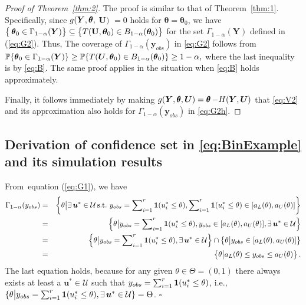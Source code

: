 \documentclass[12pt]{article}
\theoremstyle{shortspace}
\def\*#1{\bm{#1}}
\def\btheta{\mathop{\theta\kern-.45em\hbox{$\theta$}}\nolimits}
\def\P{\mathbb P}
\begin{document}
\begin{proof}[Proof of Theorem~\ref{thm:2}] The proof is similar to that of Theorem~\ref{thm:1}. Specifically, since $g(\*Y, \btheta, $ $ \*U)$ $ =0$ holds for $\*\theta = \*\theta_0$, 
we have 
$\big\{\btheta_0 \in \Gamma_{1-\alpha}({\*Y})\big\} \subseteq \big\{T({\bf U}, \*\theta_0) \in B_{1 -\alpha}(\*\theta_0)\big\}$ for the set $\Gamma_{1-\alpha}({\*Y})$ defined in (\ref{eq:G2}). Thus, 
The coverage of $\Gamma_{1-\alpha}(\*y_{obs})$ in \eqref{eq:G2} follows from  
$\P\{\btheta_0 \in \Gamma_{1-\alpha}(\*Y)\}  \geq \P\{T(\*U, \btheta_0) \in B_{1 -\alpha}(\btheta_0)\} \ge 1 - \alpha,$ where the last inequality is by \eqref{eq:B}.  The same proof applies in the situation when \eqref{eq:B} holds approximately. 

Finally, it follows immediately by making $g(\*Y, \btheta, \*U) = \btheta - H(\*Y, \*U)$ that \eqref{eq:V2} and its approximation also holds for $\Gamma_{1-\alpha}(\*y_{obs})$ in \eqref{eq:G2h}. 
\end{proof}




\subsection{Derivation of confidence set in \eqref{eq:BinExample} and its simulation results}
\label{sec:bin_example}
From~equation (\ref{eq:G1}), we have
\begin{eqnarray*}
\Gamma_{1-\alpha}(y_{obs}) &=& \bigg\{ \theta \big |  \exists \, \*u^* \in {\mathcal U} \, \hbox{s.t.} \,\, y_{obs} =  \sum\nolimits_{i =1}^r {\bf 1}{(u_i^* \leq \theta)},   
 \sum\nolimits_{i =1}^r {\bf 1}{(u_i^* \leq \theta)}
\in [a_L(\theta), a_U(\theta)] \bigg\}  \nonumber \\  
& = & \left\{ \theta \big |y_{obs} = \sum\nolimits_{i =1}^r {\bf 1}{(u_{i}^* \leq \theta)}, y_{obs}\in [a_L(
\theta), a_U(\theta)],  \exists \, \*u^* \in {\mathcal U} \right\}
\nonumber \\ 
& = & \left\{ \theta \big |y_{obs} = \sum\nolimits_{i =1}^r {\bf 1}{(u_{i}^* \leq \theta)},  \exists \, \*u^* \in {\mathcal U} \right\} \cap \left\{ 
\theta\big | y_{obs} \in [a_L(\theta), a_U(\theta)]\right\}
\nonumber \\ 
& = & \left\{ \theta \big |a_L(\theta) \leq y_{obs} \leq  a_U(\theta) \right\}. \nonumber 
\end{eqnarray*}
The last equation holds, because for any given $\theta \in \Theta = (0,1)$ there always exists at least a $\*u^* \in {\mathcal U}$ such that $y_{obs} = \sum_{i =1}^r {\bf 1}{(u_{i}^* \leq \theta)}$, i.e., $\{ \theta \big |y_{obs} = \sum_{i =1}^r {\bf 1}{(u_{i}^* \leq \theta)}, \exists \, \*u^* \in {\mathcal U} \} = \Theta$.
\hfill $\square$
\end{document}
